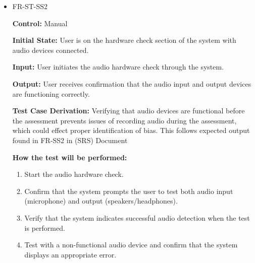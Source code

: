 \documentclass[12pt, titlepage]{article}
\begin{document}
\begin{itemize}
  \item FR-ST-SS2
    \begin{mdframed}[linewidth=0.5mm]
      \textbf{Control:} Manual \par
      \textbf{Initial State:} User is on the hardware check section of the system with audio devices connected. \par
      \textbf{Input:} User initiates the audio hardware check through the system. \par
      \textbf{Output:} User receives confirmation that the audio input and output devices are functioning correctly. \par
      \textbf{Test Case Derivation:} Verifying that audio devices are functional before the assessment prevents issues of recording audio during
      the assessment, which could effect proper identification of bias. This follows expected output found in FR-SS2 in (SRS) Document\par
      \textbf{How the test will be performed:}
      \begin{enumerate}[noitemsep]
        \item Start the audio hardware check.
        \item Confirm that the system prompts the user to test both audio input \\ (microphone) and output (speakers/headphones).
        \item Verify that the system indicates successful audio detection when the test is performed.
        \item Test with a non-functional audio device and confirm that the system displays an appropriate error.
      \end{enumerate}
    \end{mdframed}


\end{itemize}
\end{document}
